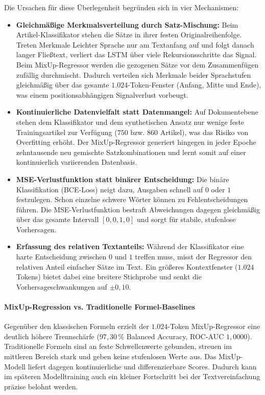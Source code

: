 Die Ursachen für diese Überlegenheit begründen sich in vier Mechanismen:
\begin{itemize}
    \item \textbf{Gleichmäßige Merkmalsverteilung durch Satz-Mischung:} Beim Artikel-Klassifikator stehen die Sätze in ihrer festen Originalreihenfolge. Treten Merkmale Leichter Sprache nur am Textanfang auf und folgt danach langer Fließtext, verliert das LSTM über viele Rekursionsschritte das Signal. Beim MixUp-Regressor werden die gezogenen Sätze vor dem Zusammenfügen zufällig durchmischt. Dadurch verteilen sich Merkmale beider Sprachstufen gleichmäßig über das gesamte $1.024$-Token-Fenster (Anfang, Mitte und Ende), was einem positionsabhängigen Signalverlust vorbeugt.
    \item \textbf{Kontinuierliche Datenvielfalt statt Datenmangel:} Auf Dokumentebene stehen dem Klassifikator und dem synthetischen Ansatz nur wenige feste Trainingsartikel zur Verfügung ($750$ bzw. $860$ Artikel), was das Risiko von Overfitting erhöht. Der MixUp-Regressor generiert hingegen in jeder Epoche zehntausende neu gemischte Satzkombinationen und lernt somit auf einer kontinuierlich variierenden Datenbasis.
    \item \textbf{MSE-Verlustfunktion statt binärer Entscheidung:} Die binäre Klassifikation (BCE-Loss) neigt dazu, Ausgaben schnell auf $0$ oder $1$ festzulegen. Schon einzelne schwere Wörter können zu Fehlentscheidungen führen. Die MSE-Verlustfunktion bestraft Abweichungen dagegen gleichmäßig über das gesamte Intervall $[0{,}0, 1{,}0]$ und sorgt für stabile, stufenlose Vorhersagen.
    \item \textbf{Erfassung des relativen Textanteils:} Während der Klassifikator eine harte Entscheidung zwischen $0$ und $1$ treffen muss, misst der Regressor den relativen Anteil einfacher Sätze im Text. Ein größeres Kontextfenster ($1.024$ Tokens) bietet dabei eine breitere Stichprobe und senkt die Vorhersageschwankungen auf $\pm 0{,}10$.
\end{itemize}

\paragraph{MixUp-Regression vs. Traditionelle Formel-Baselines}
Gegenüber den klassischen Formeln erzielt der $1.024$-Token MixUp-Regressor eine deutlich höhere Trennschärfe ($97{,}30\,\%$ Balanced Accuracy, ROC-AUC $1{,}0000$). Traditionelle Formeln sind an feste Schwellenwerte gebunden, streuen im mittleren Bereich stark und geben keine stufenlosen Werte aus. Das MixUp-Modell liefert dagegen kontinuierliche und differenzierbare Scores. Dadurch kann im späteren Modelltraining auch ein kleiner Fortschritt bei der Textvereinfachung präzise belohnt werden.



